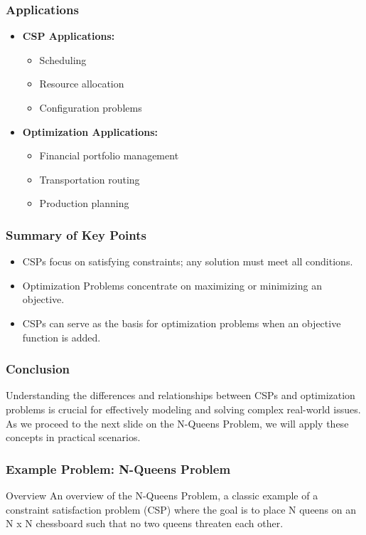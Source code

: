\documentclass[aspectratio=169]{beamer}
\begin{document}
\begin{frame}[fragile]
    \frametitle{Applications}
    
    \begin{itemize}
        \item \textbf{CSP Applications:}
        \begin{itemize}
            \item Scheduling
            \item Resource allocation
            \item Configuration problems
        \end{itemize}
        
        \item \textbf{Optimization Applications:}
        \begin{itemize}
            \item Financial portfolio management
            \item Transportation routing
            \item Production planning
        \end{itemize}
    \end{itemize}
\end{frame}

\begin{frame}[fragile]
    \frametitle{Summary of Key Points}
    
    \begin{itemize}
        \item CSPs focus on satisfying constraints; any solution must meet all conditions.
        \item Optimization Problems concentrate on maximizing or minimizing an objective.
        \item CSPs can serve as the basis for optimization problems when an objective function is added.
    \end{itemize}
\end{frame}

\begin{frame}[fragile]
    \frametitle{Conclusion}
    
    Understanding the differences and relationships between CSPs and optimization problems is crucial for effectively modeling and solving complex real-world issues. 
    As we proceed to the next slide on the N-Queens Problem, we will apply these concepts in practical scenarios.
\end{frame}

\begin{frame}[fragile]
    \frametitle{Example Problem: N-Queens Problem}
    \begin{block}{Overview}
        An overview of the N-Queens Problem, a classic example of a constraint satisfaction problem (CSP) where the goal is to place N queens on an N x N chessboard such that no two queens threaten each other.
    \end{block}
\end{frame}
\end{document}
